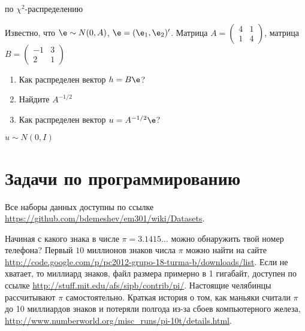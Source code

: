 \documentclass[pdftex,11pt,openany]{book}\usepackage[]{graphicx}\usepackage[]{color}
\begin{document}
\begin{solution}
по $\chi^2$-распределению 
\end{solution}


\begin{problem}
Известно, что $\e\sim N(0,A)$, $\e=(\e_1,\e_2)'$. Матрица $A=\left(\begin{matrix}
4 & 1 \\ 
1 & 4 
\end{matrix}\right)$, матрица $B=\left(\begin{matrix}
-1 & 3 \\ 
2 & 1 
\end{matrix}\right)$
\begin{enumerate}
\item Как распределен вектор $h=B\e$?
\item Найдите $A^{-1/2}$
\item Как распределен вектор $u=A^{-1/2}\e$?
\end{enumerate}
\end{problem}

\begin{solution}
$u\sim N(0,I)$ 
\end{solution}

\chapter{Задачи по программированию}

\begin{problemtext}
Все наборы данных доступны по ссылке \url{https://github.com/bdemeshev/em301/wiki/Datasets}.
\end{problemtext}

\begin{problem}
Начиная с какого знака в числе $\pi=3.1415\ldots$ можно обнаружить твой номер телефона? Первый $10$ миллионов знаков числа $\pi$ можно найти на сайте \url{http://code.google.com/p/pc2012-grupo-18-turma-b/downloads/list}. Если не хватает, то миллиард знаков, файл размера примерно в 1 гигабайт, доступен по ссылке \url{http://stuff.mit.edu/afs/sipb/contrib/pi/}. Настоящие челябинцы рассчитывают $\pi$ самостоятельно. Краткая история о том, как маньяки считали $\pi$ до 10 миллиардов знаков и потеряли полгода из-за сбоев компьютерного железа, \url{http://www.numberworld.org/misc_runs/pi-10t/details.html}. 
\end{problem}

\begin{solution}
\end{solution}
\end{document}
